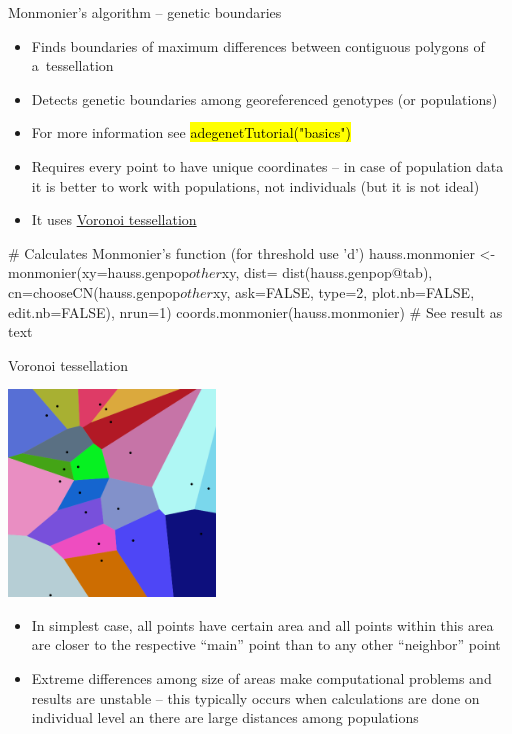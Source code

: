 \documentclass[compress, ucs, xelatex, 11pt, xcolor=svgnames,
  hyperref={
    bookmarks=true,
    unicode=true,
    colorlinks=true,
    pdftitle={Molecular data in R},
    plainpages=false,
    pdfauthor={Vojtech Zeisek},
    pdfsubject={Course about phylogeny and evolution in R},
    pdfcreator={XeLaTeX},
    pdfkeywords={R, evolution, phylogeny, molecular data},
    linkcolor=Tomato,
    anchorcolor=SaddleBrown,
    citecolor=Goldenrod,
    filecolor=DarkMagenta,
    menucolor=Sienna,
    urlcolor=DarkTurquoise,
    pdftex},
  url={hyphens, lowtilde} %
  ]{beamer}
\renewcommand{\texttt}[1]{\hl{\ttfamily #1}}
\begin{document}
\begin{frame}[fragile]{Monmonier's algorithm -- genetic boundaries}
  \begin{itemize}
    \item Finds boundaries of maximum differences between contiguous polygons of a~tessellation
    \item Detects genetic boundaries among georeferenced genotypes (or populations)
    \item For more information see \texttt{adegenetTutorial("basics")}
    \item Requires every point to have unique coordinates -- in case of population data it is better to work with populations, not individuals (but it is not ideal)
    \item It uses \href{https://en.wikipedia.org/wiki/Voronoi_diagram}{Voronoi tessellation}
  \end{itemize}
  \begin{spluscode}
    # Calculates Monmonier's function (for threshold use 'd')
    hauss.monmonier <- monmonier(xy=hauss.genpop$other$xy, dist=
      dist(hauss.genpop@tab), cn=chooseCN(hauss.genpop$other$xy,
      ask=FALSE, type=2, plot.nb=FALSE, edit.nb=FALSE), nrun=1)
    coords.monmonier(hauss.monmonier) # See result as text
  \end{spluscode}
\end{frame}

\begin{frame}{Voronoi tessellation}
  \begin{multicols}{2}
    \includegraphics[height=5.5cm]{voronoi_diagram.png}
    \begin{itemize}
      \item In simplest case, all points have certain area and all points within this area are closer to the respective ``main'' point than to any other ``neighbor'' point
      \item Extreme differences among size of areas make computational problems and results are unstable -- this typically occurs when calculations are done on individual level an there are large distances among populations
    \end{itemize}
  \end{multicols}
\end{frame}
\end{document}
